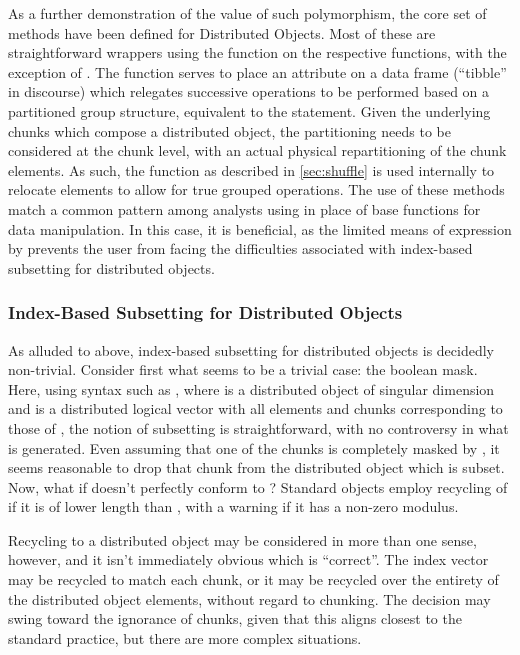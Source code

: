 As a further demonstration of the value of such polymorphism, the core set of  methods have been defined for Distributed Objects.
Most of these are straightforward wrappers using the  function on the respective  functions, with the exception of .
The  function serves to place an attribute on a data frame (``tibble'' in  discourse) which relegates successive operations to be performed based on a partitioned group structure, equivalent to the   statement.
Given the underlying chunks which compose a distributed object, the partitioning needs to be considered at the chunk level, with an actual physical repartitioning of the chunk elements.
As such, the  function as described in \cref{sec:shuffle} is used internally to relocate elements to allow for true grouped operations.
The use of these methods match a common pattern among analysts using  in place of base \R{} functions for data manipulation.
In this case, it is beneficial, as the limited means of expression by  prevents the user from facing the difficulties associated with index-based subsetting for distributed objects.

\subsubsection{Index-Based Subsetting for Distributed Objects}

As alluded to above, index-based subsetting for distributed objects is decidedly non-trivial.
Consider first what seems to be a trivial case: the boolean mask.
Here, using syntax such as , where  is a distributed object of singular dimension and  is a distributed logical vector with all elements and chunks corresponding to those of , the notion of subsetting is straightforward, with no controversy in what is generated.
Even assuming that one of the chunks is completely masked by , it seems reasonable to drop that chunk from the distributed object which is subset.
Now, what if  doesn't perfectly conform to ?
Standard \R{} objects employ recycling of  if it is of lower length than , with a warning if it has a non-zero modulus.

Recycling to a distributed object may be considered in more than one sense, however, and it isn't immediately obvious which is ``correct''.
The index vector may be recycled to match each chunk, or it may be recycled over the entirety of the distributed object elements, without regard to chunking.
The decision may swing toward the ignorance of chunks, given that this aligns closest to the standard \R{} practice, but there are more complex situations.

